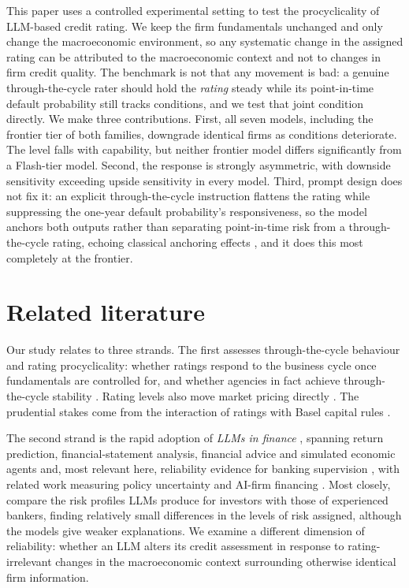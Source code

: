 \documentclass[a4paper,fleqn]{cas-sc}
\begin{document}
This paper uses a controlled experimental setting to test the procyclicality of LLM-based credit
rating. We keep the firm fundamentals unchanged and only change the macroeconomic environment, so any
systematic change in the assigned rating can be attributed to the macroeconomic context and not to
changes in firm credit quality. The benchmark is not that any movement is bad: a genuine
through-the-cycle rater should hold the \emph{rating} steady while its point-in-time default
probability still tracks conditions, and we test that joint condition directly. We make three
contributions. First, all seven models, including the frontier tier of both families, downgrade
identical firms as conditions deteriorate. The level falls with capability, but neither frontier model
differs significantly from a Flash-tier model. Second, the response is strongly
asymmetric, with downside sensitivity exceeding upside sensitivity in every model. Third, prompt design
does not fix it: an explicit through-the-cycle instruction flattens the rating while suppressing the
one-year default probability's responsiveness, so the model anchors both outputs rather than separating
point-in-time risk from a through-the-cycle rating, echoing classical anchoring effects
\citep{tversky1974}, and it does this most completely at the frontier. 

\section{Related literature}\label{sec:lit}
Our study relates to three strands. The first assesses through-the-cycle behaviour and rating
procyclicality: whether ratings respond to the business cycle once fundamentals are controlled for,
and whether agencies in fact achieve through-the-cycle stability
\citep{amato2004,loffler2004,loffler2013}. Rating levels also move market pricing directly
\citep{cantor1996}. The prudential stakes come from the interaction of ratings
with Basel capital rules \citep{kashyap2004,gordy2006}.

The second strand is the rapid adoption of \emph{LLMs in finance}
\citep{ali2025}, spanning return prediction, financial-statement analysis, financial advice and
simulated economic agents \citep{lopezlira2023,kim2024,fieberg2025,horton2023}
and, most relevant here, reliability evidence for banking supervision \citep{garcia2026},
with related work measuring policy uncertainty and AI-firm financing
\citep{ito2025,giaretta2026}. Most closely, \citet{hens2025} compare the risk profiles LLMs produce for investors
with those of experienced bankers, finding relatively small differences in the levels of risk
assigned, although the models give weaker explanations. We examine a different dimension of reliability: whether an LLM alters its credit assessment in response to rating-irrelevant
changes in the macroeconomic context surrounding otherwise identical firm information.
\end{document}
